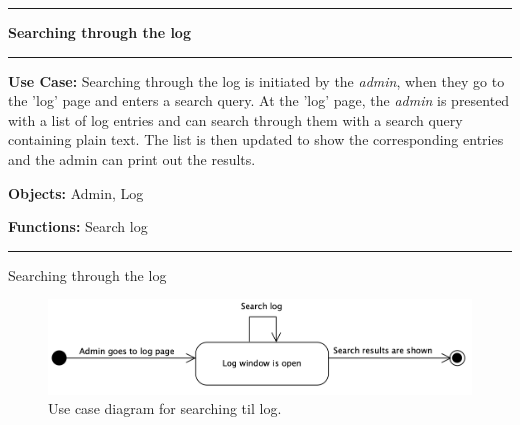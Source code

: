 \begin{use_case}[H]
    \hrule
    \vskip 0.3cm
    \Large
    \begin{center}
    
        \textbf{Searching through the log}
        
    \end{center}
    \vskip 0.1cm
    \hrule
    \vskip 0.2cm
    \normalsize
    
    \textbf{Use Case:} Searching through the log is initiated by the \textit{admin}, when they go to the 'log' page and enters a search query. At the 'log' page, the \textit{admin} is presented with a list of log entries and can search through them with a search query containing plain text. The list is then updated to show the corresponding entries and the admin can print out the results.
    
    \vskip 0.2cm
    
    \textbf{Objects:} Admin, Log
    
    \vskip 0.2cm
    
    \textbf{Functions:} Search log
    
    \vskip 0.4cm
    \hrule
    \vskip 0.2cm
    \caption{Searching through the log} \label{use_case:searching_through_the_log}
\end{use_case}

\begin{figure}[H]
    \centering
    \includegraphics[width=1.0\textwidth]{figures/SearchLog.png}
    \caption{Use case diagram for searching til log.}
    \label{fig:UseCaseSearchLog}
\end{figure}


